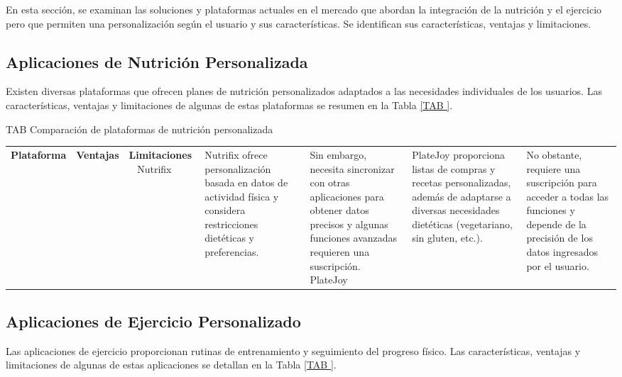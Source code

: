 En esta sección, se examinan las soluciones y plataformas actuales en el mercado que abordan la integración de la nutrición y el ejercicio pero que permiten una personalización según el usuario y sus características. Se identifican sus características, ventajas y limitaciones.

\subsection{Aplicaciones de Nutrición Personalizada}

Existen diversas plataformas que ofrecen planes de nutrición personalizados adaptados a las necesidades individuales de los usuarios. Las características, ventajas y limitaciones de algunas de estas plataformas se resumen en la Tabla \ref{TAB
}.

\begin{table}[Plataformas de Nutrición Personalizada]{TAB
}{Comparación de plataformas de nutrición personalizada}
\begin{tabular}{|p{3cm}|p{5cm}|p{5cm}|}
\hline
\textbf{Plataforma} & \textbf{Ventajas} & \textbf{Limitaciones} \
\hline
Nutrifix & Nutrifix ofrece personalización basada en datos de actividad física y considera restricciones dietéticas y preferencias. & Sin embargo, necesita sincronizar con otras aplicaciones para obtener datos precisos y algunas funciones avanzadas requieren una suscripción. \
\hline
PlateJoy & PlateJoy proporciona listas de compras y recetas personalizadas, además de adaptarse a diversas necesidades dietéticas (vegetariano, sin gluten, etc.). & No obstante, requiere una suscripción para acceder a todas las funciones y depende de la precisión de los datos ingresados por el usuario. \
\hline
\end{tabular}
\end{table}

\subsection{Aplicaciones de Ejercicio Personalizado}

Las aplicaciones de ejercicio proporcionan rutinas de entrenamiento y seguimiento del progreso físico. Las características, ventajas y limitaciones de algunas de estas aplicaciones se detallan en la Tabla \ref{TAB
}.

